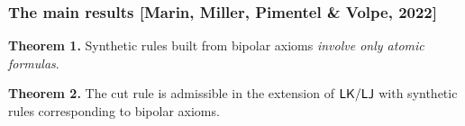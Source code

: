 \documentclass[9pt]{beamer}
\begin{document}
\begin{frame}
\frametitle{The main results [Marin, Miller, Pimentel \& Volpe, 2022]}	
	
	\begin{block}{}
		\textbf{Theorem 1.} 
		Synthetic rules built from bipolar axioms 
                \emph{involve only atomic formulas}.
	\end{block}
	
	\bigskip
	
	\begin{block}{}
		\textbf{Theorem 2.} 
		The cut rule is admissible in the extension of $\mathsf{LK}/\mathsf{LJ}$ with 
                synthetic rules corresponding to bipolar axioms.
	\end{block}


\end{frame}
\end{document}
